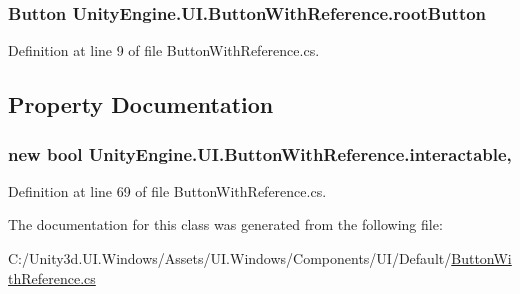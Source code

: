 \subsubsection[{root\+Button}]{\setlength{\rightskip}{0pt plus 5cm}Button Unity\+Engine.\+U\+I.\+Button\+With\+Reference.\+root\+Button}\label{class_unity_engine_1_1_u_i_1_1_button_with_reference_a708bfbc4f19404b7625e57dc1e62d164}


Definition at line 9 of file Button\+With\+Reference.\+cs.



\subsection{Property Documentation}
\hypertarget{class_unity_engine_1_1_u_i_1_1_button_with_reference_a8d984d0e69caeffeffe56eb463961350}{}
\subsubsection[{interactable}]{\setlength{\rightskip}{0pt plus 5cm}new bool Unity\+Engine.\+U\+I.\+Button\+With\+Reference.\+interactable\hspace{0.3cm}{\ttfamily [get]}, {\ttfamily [set]}}\label{class_unity_engine_1_1_u_i_1_1_button_with_reference_a8d984d0e69caeffeffe56eb463961350}


Definition at line 69 of file Button\+With\+Reference.\+cs.



The documentation for this class was generated from the following file\+:\begin{DoxyCompactItemize}
\item 
C\+:/\+Unity3d.\+U\+I.\+Windows/\+Assets/\+U\+I.\+Windows/\+Components/\+U\+I/\+Default/\hyperlink{_button_with_reference_8cs}{Button\+With\+Reference.\+cs}\end{DoxyCompactItemize}
